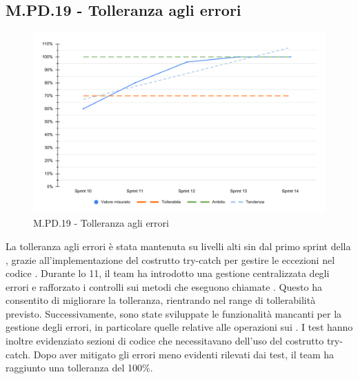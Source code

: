 \subsection{M.PD.19 - Tolleranza agli errori}

\begin{figure}[H]
  \centering
  \includegraphics[width=\textwidth]{assets/tolleranza_errori.pdf}
  \caption{M.PD.19 - Tolleranza agli errori}
\end{figure}

\par La tolleranza agli errori è stata mantenuta su livelli alti sin dal primo sprint della , grazie all'implementazione del costrutto try-catch per gestire le eccezioni nel codice . Durante lo  11, il team ha introdotto una gestione centralizzata degli errori e rafforzato i controlli sui metodi che eseguono chiamate . Questo ha consentito di migliorare la tolleranza, rientrando nel range di tollerabilità previsto. Successivamente, sono state sviluppate le funzionalità mancanti per la gestione degli errori, in particolare quelle relative alle operazioni  sui . I test hanno inoltre evidenziato sezioni di codice che necessitavano dell'uso del costrutto try-catch. Dopo aver mitigato gli errori meno evidenti rilevati dai test, il team ha raggiunto una tolleranza del 100\%.
